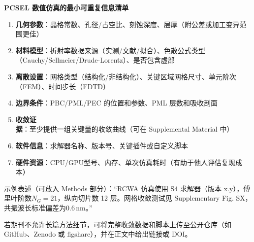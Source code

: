 \begin{ReportingStandardBox}
\textbf{PCSEL 数值仿真的最小可重复信息清单}
\begin{enumerate}
  \item \textbf{几何参数}：晶格常数、孔径/占空比、刻蚀深度、层厚（附公差或加工变异范围更佳）
  \item \textbf{材料模型}：折射率数据来源（实测/文献/拟合）、色散公式类型（Cauchy/Sellmeier/Drude-Lorentz）、是否包含虚部
  \item \textbf{离散设置}：网格类型（结构化/非结构化）、关键区域网格尺寸、单元阶次（FEM）、时间步长（FDTD）
  \item \textbf{边界条件}：PBC/PML/PEC 的位置和参数、PML 层数和吸收剖面
  \item \textbf{收敛证据}：至少提供一组关键量的收敛曲线（可在 Supplemental Material 中）
  \item \textbf{软件信息}：求解器名称、版本号、关键插件或自定义脚本
  \item \textbf{硬件资源}：CPU/GPU型号、内存、单次仿真耗时（有助于他人评估复现成本）
\end{enumerate}
示例表述（可放入 Methods 部分）：“RCWA 仿真使用 S4 求解器（版本 x.y），傅里叶阶数$N_G=21$，纵向切片数 12 层。网格收敛测试见 Supplementary Fig. SX，共振波长标准偏差为$0.6\,$nm。”
\end{ReportingStandardBox}

若期刊不允许长篇方法细节，可将完整收敛数据和脚本上传至公开仓库（如 GitHub、Zenodo 或 figshare），并在正文中给出链接或 DOI。
